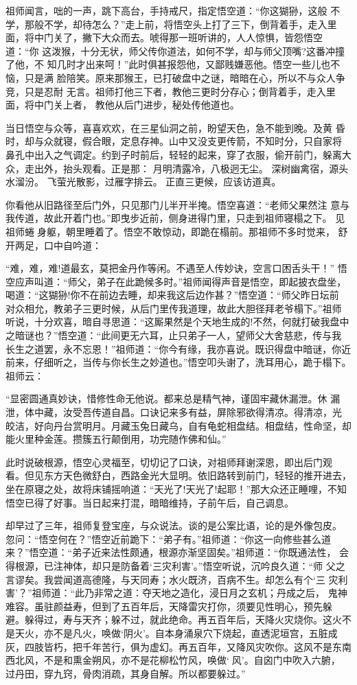 祖师闻言，咄的一声，跳下高台，手持戒尺，指定悟空道：“你这猢狲，这般
不学，那般不学，却待怎么？”走上前，将悟空头上打了三下，倒背着手，走入里
面，将中门关了，撇下大众而去。唬得那一班听讲的，人人惊惧，皆怨悟空道：“你
这泼猴，十分无状，师父传你道法，如何不学，却与师父顶嘴?这番冲撞了他，不
知几时才出来呵！”此时俱甚报怨他，又鄙贱嫌恶他。悟空一些儿也不恼，只是满
脸陪笑。原来那猴王，已打破盘中之谜，暗暗在心，所以不与众人争竞，只是忍耐
无言。祖师打他三下者，教他三更时分存心；倒背着手，走入里面，将中门关上者，
教他从后门进步，秘处传他道也。

当日悟空与众等，喜喜欢欢，在三星仙洞之前，盼望天色，急不能到晚。及黄
昏时，却与众就寝，假合眼，定息存神。山中又没支更传箭，不知时分，只自家将
鼻孔中出入之气调定。约到子时前后，轻轻的起来，穿了衣服，偷开前门，躲离大
众，走出外，抬头观看。正是那：
月明清露冷，八极迥无尘。
深树幽禽宿，源头水溜汾。
飞萤光散影，过雁字排云。
正直三更候，应该访道真。

你看他从旧路径至后门外，只见那门儿半开半掩。悟空喜道：“老师父果然注
意与我传道，故此开着门也。”即曳步近前，侧身进得门里，只走到祖师寝榻之下。
见祖师蜷身躯，朝里睡着了。悟空不敢惊动，即跪在榻前。那祖师不多时觉来，
舒开两足，口中自吟道：

“难，难，难!道最玄，莫把金丹作等闲。不遇至人传妙诀，空言口困舌头干！”
悟空应声叫道：“师父，弟子在此跪候多时。”祖师闻得声音是悟空，即起披衣盘坐，
喝道：“这猢狲!你不在前边去睡，却来我这后边作甚？”悟空道：“师父昨日坛前
对众相允，教弟子三更时候，从后门里传我道理，故此大胆径拜老爷榻下。”祖师
听说，十分欢喜，暗自寻思道：“这厮果然是个天地生成的!不然，何就打破我盘中
之暗谜也？”悟空道：“此间更无六耳，止只弟子一人，望师父大舍慈悲，传与我
长生之道罢，永不忘恩！”祖师道：“你今有缘，我亦喜说。既识得盘中暗谜，你近
前来，仔细听之，当传与你长生之妙道也。”悟空叩头谢了，洗耳用心，跪于榻下。
祖师云：

“显密圆通真妙诀，惜修性命无他说。都来总是精气神，谨固牢藏休漏泄。休
漏泄，体中藏，汝受吾传道自昌。口诀记来多有益，屏除邪欲得清凉。得清凉，光
皎洁，好向丹台赏明月。月藏玉兔日藏乌，自有龟蛇相盘结。相盘结，性命坚，却
能火里种金莲。攒簇五行颠倒用，功完随作佛和仙。”

此时说破根源，悟空心灵福至，切切记了口诀，对祖师拜谢深恩，即出后门观
看。但见东方天色微舒白，西路金光大显明。依旧路转到前门，轻轻的推开进去，
坐在原寝之处，故将床铺摇响道：“天光了!天光了!起耶！”那大众还正睡哩，不知
悟空已得了好事。当日起来打混，暗暗维持，子前午后，自己调息。

却早过了三年，祖师复登宝座，与众说法。谈的是公案比语，论的是外像包皮。
忽问：“悟空何在？”悟空近前跪下：“弟子有。”祖师道：“你这一向修些甚么道
来？”悟空道：“弟子近来法性颇通，根源亦渐坚固矣。”祖师道：“你既通法性，
会得根源，已注神体，却只是防备着‘三灾利害’。”悟空听说，沉吟良久道：“师
父之言谬矣。我尝闻道高德隆，与天同寿；水火既济，百病不生。却怎么有个‘三
灾利害’？”祖师道：“此乃非常之道：夺天地之造化，浸日月之玄机；丹成之后，
鬼神难容。虽驻颜益寿，但到了五百年后，天降雷灾打你，须要见性明心，预先躲
避。躲得过，寿与天齐；躲不过，就此绝命。再五百年后，天降火灾烧你。这火不
是天火，亦不是凡火，唤做‘阴火’。自本身涌泉穴下烧起，直透泥垣宫，五脏成
灰，四肢皆朽，把千年苦行，俱为虚幻。再五百年，又降风灾吹你。这风不是东南
西北风，不是和熏金朔风，亦不是花柳松竹风，唤做‘风’。自囟门中吹入六腑，
过丹田，穿九窍，骨肉消疏，其身自解。所以都要躲过。”

